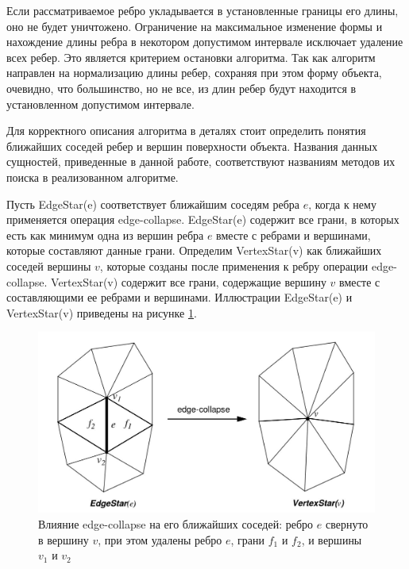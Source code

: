 \documentclass[14pt]{article}
\numberwithin{figure}{section}
\numberwithin{equation}{section}
\begin{document}
Если рассматриваемое ребро укладывается в установленные границы его длины, оно не будет уничтожено. Ограничение на максимальное изменение формы и нахождение длины ребра в некотором допустимом интервале исключает удаление всех ребер. Это является критерием остановки алгоритма. Так как алгоритм направлен на нормализацию длины ребер, сохраняя при этом форму объекта, очевидно, что большинство, но не все, из длин ребер будут находится в установленном допустимом интервале.

Для корректного описания алгоритма в деталях стоит определить понятия ближайших соседей ребер и вершин поверхности объекта. Названия данных сущностей, приведенные в данной работе, соответствуют названиям методов их поиска в реализованном алгоритме.

Пусть EdgeStar(e) соответствует ближайшим соседям ребра $e$, когда к нему применяется операция edge-collapse. EdgeStar(e) содержит все грани, в которых есть как минимум одна из вершин ребра $e$ вместе с ребрами и вершинами, которые составляют данные грани. Определим VertexStar(v) как ближайших соседей вершины $v$, которые созданы после применения к ребру операции edge-collapse. VertexStar(v) содержит все грани, содержащие вершину $v$ вместе с составляющими ее ребрами и вершинами. Иллюстрации EdgeStar(e) и VertexStar(v) приведены на рисунке \ref{ris:mc2}.

\begin{figure}
	\begin{center}
		\includegraphics[scale = 0.3]{mc2.JPG}
		\caption{Влияние edge-collapse на его ближайших соседей: ребро $e$ свернуто в вершину $v$, при этом удалены ребро $e$, грани $f_1$ и $f_2$, и вершины $v_1$ и $v_2$}
		\label{ris:mc2}
	\end{center}
\end{figure}
\end{document}
